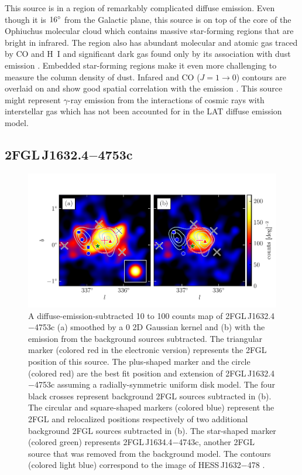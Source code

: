This source is in a region of remarkably complicated diffuse emission.
Even though it is $16^\circ$ from the Galactic plane, this source
is on top of the core of the Ophiuchus molecular cloud which
contains massive star-forming regions that are bright in infrared.
The region also has abundant molecular and atomic gas traced by CO
and H~I and significant dark gas found only by its association with
dust emission \citep{grenier_2005a_unveiling-extensive}. Embedded
star-forming regions make it even more challenging to measure
the column density of dust.  Infared and CO ($J=1\rightarrow
0$) contours are overlaid on 
and show good spatial correlation with the \gev emission
\citep{young_1986a_high-resolution-observations,de-geus_1990a_survey-clouds}.
This source might represent $\gamma$-ray emission from the interactions
of cosmic rays with interstellar gas which has not been accounted for
in the LAT diffuse emission model.

\subsection{2FGL\,J1632.4$-$4753c}

\begin{figure}[htbp]
  \includegraphics{source_plots/source_HESS_J1632-478_color.pdf}
  \caption{A diffuse-emission-subtracted 10 \gev to 100 \gev counts map
  of 2FGL\,J1632.4$-$4753c (a) smoothed by a 0 2D Gaussian kernel
  and (b) with the emission from the background sources subtracted.
  The triangular marker (colored red in the electronic version)
  represents the 2FGL position of this source.  The plus-shaped marker
  and the circle (colored red) are the best fit position and extension of
  2FGL\,J1632.4$-$4753c assuming a radially-symmetric uniform disk model.
  The four black crosses represent background 2FGL sources subtracted in
  (b).  The circular and square-shaped markers (colored blue) represent
  the 2FGL and relocalized positions respectively of two additional
  background 2FGL sources subtracted in (b).  The star-shaped marker
  (colored green) represents 2FGL\,J1634.4$-$4743c, another 2FGL
  source that was removed from the background model.  The contours
  (colored light blue) correspond to the \tev image of HESS\,J1632$-$478
  \citep{aharonian_2006a_h.e.s.s.-survey}.}
\end{figure}

